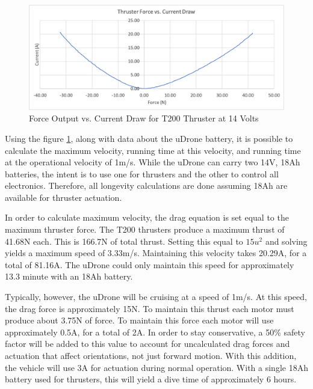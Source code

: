 \begin{figure}[h]
\includegraphics[width=\maxwidth{\textwidth}]{img/force_amps.png}
\caption{Force Output vs. Current Draw for T200 Thruster at 14 Volts}
\label{force_amp}
\end{figure}


Using the figure \ref{force_amp}, along with data about the uDrone battery, it is possible to calculate the maximum velocity, running time at this velocity, and running time at the operational velocity of 1m/s. While the uDrone can carry two 14V, 18Ah batteries, the intent is to use one for thrusters and the other to control all electronics. Therefore, all longevity calculations are done assuming 18Ah are available for thruster actuation. 

In order to calculate maximum velocity, the drag equation is set equal to the maximum thruster force. The T200 thrusters produce a maximum thrust of 41.68N each. This is 166.7N of total thrust. Setting this equal to $15u^2$ and solving yields a maximum speed of 3.33m/s. Maintaining this velocity takes 20.29A, for a total of 81.16A. The uDrone could only maintain this speed for approximately 13.3 minute with an 18Ah battery.

Typically, however, the uDrone will be cruising at a speed of 1m/s. At this speed, the drag force is approximately 15N. To maintain this thrust each motor must produce about 3.75N of force. To maintain this force each motor will use approximately 0.5A, for a total of 2A. In order to stay conservative, a 50\% safety factor will be added to this value to account for uncalculated drag forces and actuation that affect orientations, not just forward motion. With this addition, the vehicle will use 3A for actuation during normal operation. With a single 18Ah battery used for thrusters, this will yield a dive time of approximately 6 hours. 

